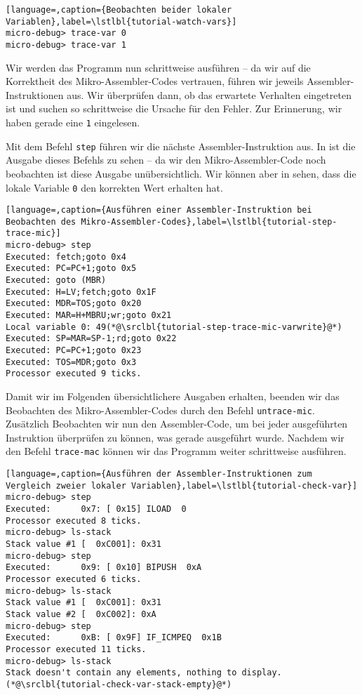 \begin{lstlisting}[language=,caption={Beobachten beider lokaler Variablen},label=\lstlbl{tutorial-watch-vars}]
micro-debug> trace-var 0
micro-debug> trace-var 1
\end{lstlisting}

Wir werden das Programm nun schrittweise ausführen -- da wir auf die Korrektheit des Mikro-Assembler-Codes vertrauen, führen wir jeweils Assembler-Instruktionen aus. Wir überprüfen dann, ob das erwartete Verhalten eingetreten ist und suchen so schrittweise die Ursache für den Fehler. Zur Erinnerung, wir haben gerade eine \texttt{1} eingelesen.

Mit dem Befehl \texttt{step} führen wir die nächste Assembler-Instruktion aus. In  ist die Ausgabe dieses Befehls zu sehen -- da wir den Mikro-Assembler-Code noch beobachten ist diese Ausgabe unübersichtlich. Wir können aber in  sehen, dass die lokale Variable \texttt{0} den korrekten Wert erhalten hat.

\begin{lstlisting}[language=,caption={Ausführen einer Assembler-Instruktion bei Beobachten des Mikro-Assembler-Codes},label=\lstlbl{tutorial-step-trace-mic}]
micro-debug> step
Executed: fetch;goto 0x4
Executed: PC=PC+1;goto 0x5
Executed: goto (MBR)
Executed: H=LV;fetch;goto 0x1F
Executed: MDR=TOS;goto 0x20
Executed: MAR=H+MBRU;wr;goto 0x21
Local variable 0: 49(*@\srclbl{tutorial-step-trace-mic-varwrite}@*)
Executed: SP=MAR=SP-1;rd;goto 0x22
Executed: PC=PC+1;goto 0x23
Executed: TOS=MDR;goto 0x3
Processor executed 9 ticks.
\end{lstlisting}

Damit wir im Folgenden übersichtlichere Ausgaben erhalten, beenden wir das Beobachten des Mikro-Assembler-Codes durch den Befehl \texttt{untrace-mic}. Zusätzlich Beobachten wir nun den Assembler-Code, um bei jeder ausgeführten Instruktion überprüfen zu können, was gerade ausgeführt wurde. Nachdem wir den Befehl \texttt{trace-mac} können wir das Programm weiter schrittweise ausführen.

\begin{lstlisting}[language=,caption={Ausführen der Assembler-Instruktionen zum Vergleich zweier lokaler Variablen},label=\lstlbl{tutorial-check-var}]
micro-debug> step
Executed:      0x7: [ 0x15] ILOAD  0
Processor executed 8 ticks.
micro-debug> ls-stack
Stack value #1 [  0xC001]: 0x31
micro-debug> step
Executed:      0x9: [ 0x10] BIPUSH  0xA
Processor executed 6 ticks.
micro-debug> ls-stack
Stack value #1 [  0xC001]: 0x31
Stack value #2 [  0xC002]: 0xA
micro-debug> step
Executed:      0xB: [ 0x9F] IF_ICMPEQ  0x1B
Processor executed 11 ticks.
micro-debug> ls-stack
Stack doesn't contain any elements, nothing to display.(*@\srclbl{tutorial-check-var-stack-empty}@*)
\end{lstlisting}


